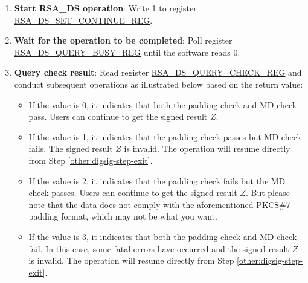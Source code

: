 \documentclass[main\_\_EN.tex]{subfiles}
\begin{document}
\begin{enumerate}
\begin{itemize}
    \end{itemize}


    \item {\bfseries Start RSA\_DS operation}: Write 1 to register \hyperref[regdesc:RSADSSETCONTINUEREG]{RSA\_DS\_SET\_CONTINUE\_REG}.
    \item {\bfseries Wait for the operation to be completed}: Poll register \hyperref[regdesc:RSADSQUERYBUSYREG]{RSA\_DS\_QUERY\_BUSY\_REG} until the software reads 0.

    \item {\bfseries Query check result}: Read register \hyperref[regdesc:RSADSQUERYCHECKREG]{RSA\_DS\_QUERY\_CHECK\_REG} and conduct subsequent operations as illustrated below based on the return value:

    \begin{itemize}

        \item If the value is 0, it indicates that both the padding check and MD check pass. Users can continue to get the signed result \begin{math}Z\end{math}.

        \item If the value is 1, it indicates that the padding check passes but MD check fails. The signed result \begin{math}Z\end{math} is invalid. The operation will resume directly from Step \ref{other:digsig-step-exit}.

        \item If the value is 2, it indicates that the padding check fails but the MD check passes. Users can continue to get the signed result \begin{math}Z\end{math}. But please note that the data does not comply with the aforementioned PKCS\#7 padding format, which may not be what you want.

        \item If the value is 3, it indicates that both the padding check and MD check fail. In this case, some fatal errors have occurred and the signed result \begin{math}Z\end{math} is invalid. The operation will resume directly from Step \ref{other:digsig-step-exit}.

    \end{itemize}


\end{enumerate}
\end{document}
